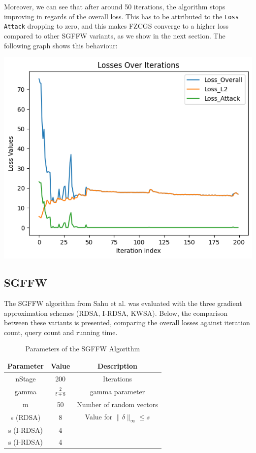 \documentclass[10pt,twocolumn,letterpaper]{article}
\begin{document}
Moreover, we can see that after around 50 iterations, the algorithm stops 
improving in regards of the overall loss. This has to be attributed to the \texttt{Loss Attack} dropping
to zero, and this makes FZCGS converge to a higher loss compared to other SGFFW variants, as we show in the next section.
The following graph shows this behaviour:

\begin{center}
   \includegraphics*[scale=0.45]{img/FZCGS_Losses.png}
\end{center}


\subsection{SGFFW}

The SGFFW algorithm from Sahu et al.\cite{Sahu} was evaluated with the three
gradient approximation schemes (RDSA, I-RDSA, KWSA).
Below, the comparison between these variants is presented,
comparing the overall losses against iteration count, query count and running time.


\begin{table}[h]
   \centering
   \begin{tabular}{ccc}
       \hline
       \textbf{Parameter} & \textbf{Value} & \textbf{Description} \\
       \hline
       nStage & 200 & Iterations\\
       \hline
       gamma & $\frac{2}{t+8}$ & gamma parameter \\
       \hline
       m & 50 & Number of random vectors\\
       \hline
       s (RDSA) & 8 & Value for $\|\delta\|_{\infty} \leq s$\\
       s (I-RDSA) & 4 & \\
       s (I-RDSA) & 4 & \\
       \hline
   \end{tabular}
   \
   \caption{Parameters of the SGFFW Algorithm} 
   \label{tab:sgffw_params}
\end{table}
\end{document}
